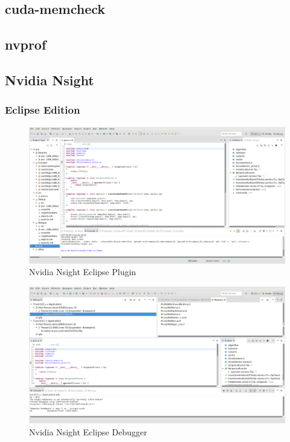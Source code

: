 			\subsection{cuda-memcheck}
			\subsection{nvprof}
			\subsection{Nvidia Nsight}
			    \subsubsection*{Eclipse Edition}
                    \begin{figure}[h]
			            \centering
			            \includegraphics[width=\textwidth]{chapter3/pictures/NEplugin.png}
			            \caption{Nvidia Nsight Eclipse Plugin}
			            \label{fig3:neplugin}
                    \end{figure}
                    \begin{figure}[h]
			            \centering
			            \includegraphics[width=\textwidth]{chapter3/pictures/NEdebug.png}
			            \caption{Nvidia Nsight Eclipse Debugger}
			            \label{fig3:nedebug}
                    \end{figure}
